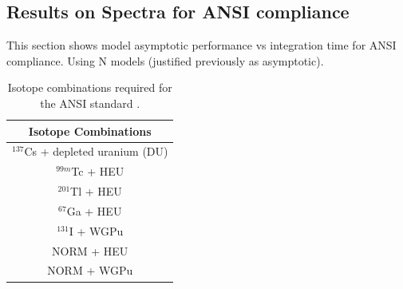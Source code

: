 


\subsection{Results on Spectra for ANSI compliance}

This section shows model asymptotic performance vs integration time for ANSI compliance. Using N models (justified previously as asymptotic). 



\begin{table}[H]
\centering
\caption{Isotope combinations required for the ANSI standard \cite{ANSI}.}
\begin{tabular}{c}
Isotope Combinations \\ \hline
$^{137}$Cs + depleted uranium (DU) \\ %
$^{99m}$Tc + HEU \\ %
$^{201}$Tl + HEU \\ %
$^{67}$Ga + HEU \\ %
$^{131}$I + WGPu \\ %
NORM + HEU \\ %
NORM + WGPu \\ %
\end{tabular}
\end{table}



